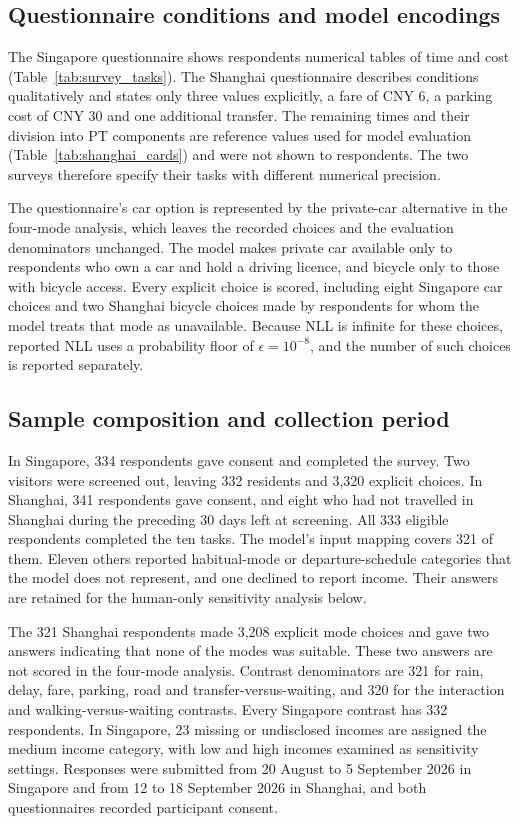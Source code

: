 \subsection{Questionnaire conditions and model encodings}
The Singapore questionnaire shows respondents numerical tables of time and cost (Table~\ref{tab:survey_tasks}). The Shanghai questionnaire describes conditions qualitatively and states only three values explicitly, a fare of CNY 6, a parking cost of CNY 30 and one additional transfer. The remaining times and their division into PT components are reference values used for model evaluation (Table~\ref{tab:shanghai_cards}) and were not shown to respondents. The two surveys therefore specify their tasks with different numerical precision.


The questionnaire's car option is represented by the private-car alternative in the four-mode analysis, which leaves the recorded choices and the evaluation denominators unchanged. The model makes private car available only to respondents who own a car and hold a driving licence, and bicycle only to those with bicycle access. Every explicit choice is scored, including eight Singapore car choices and two Shanghai bicycle choices made by respondents for whom the model treats that mode as unavailable. Because NLL is infinite for these choices, reported NLL uses a probability floor of $\epsilon=10^{-8}$, and the number of such choices is reported separately.

\subsection{Sample composition and collection period}
In Singapore, 334 respondents gave consent and completed the survey. Two visitors were screened out, leaving 332 residents and 3,320 explicit choices. In Shanghai, 341 respondents gave consent, and eight who had not travelled in Shanghai during the preceding 30 days left at screening. All 333 eligible respondents completed the ten tasks. The model's input mapping covers 321 of them. Eleven others reported habitual-mode or departure-schedule categories that the model does not represent, and one declined to report income. Their answers are retained for the human-only sensitivity analysis below.

The 321 Shanghai respondents made 3,208 explicit mode choices and gave two answers indicating that none of the modes was suitable. These two answers are not scored in the four-mode analysis. Contrast denominators are 321 for rain, delay, fare, parking, road and transfer-versus-waiting, and 320 for the interaction and walking-versus-waiting contrasts. Every Singapore contrast has 332 respondents. In Singapore, 23 missing or undisclosed incomes are assigned the medium income category, with low and high incomes examined as sensitivity settings. Responses were submitted from 20 August to 5 September 2026 in Singapore and from 12 to 18 September 2026 in Shanghai, and both questionnaires recorded participant consent.

